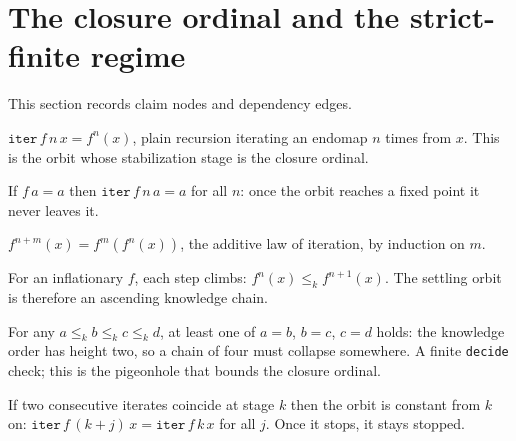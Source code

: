 \section{The closure ordinal and the strict-finite regime}

This section records claim nodes and dependency edges.

\begin{proposition}\label{thm:iter}\leanok{}
$\texttt{iter}\,f\,n\,x = f^n(x)$, plain recursion iterating an endomap $n$ times
from $x$. This is the orbit whose stabilization stage is the closure ordinal.
\end{proposition}
\begin{theorem}\label{thm:iter-fixed-of}\leanok{}
If $f\,a = a$ then $\texttt{iter}\,f\,n\,a = a$ for all $n$: once the orbit
reaches a fixed point it never leaves it.
\end{theorem}
\begin{theorem}\label{thm:iter-add}\leanok{}
$f^{n+m}(x) = f^m(f^n(x))$, the additive law of iteration, by induction on $m$.
\end{theorem}
\begin{theorem}\label{thm:iter-step-le}\leanok{}
For an inflationary $f$, each step climbs: $f^n(x) \le_k f^{n+1}(x)$. The
settling orbit is therefore an ascending knowledge chain.
\end{theorem}
\begin{theorem}\label{thm:kchain-height}\leanok{}
For any $a \le_k b \le_k c \le_k d$, at least one of $a=b$, $b=c$, $c=d$ holds:
the knowledge order has height two, so a chain of four must collapse somewhere.
A finite \texttt{decide} check; this is the pigeonhole that bounds the closure
ordinal.
\end{theorem}
\begin{theorem}\label{thm:iter-propagate}\leanok{}
If two consecutive iterates coincide at stage $k$ then the orbit is constant
from $k$ on: $\texttt{iter}\,f\,(k+j)\,x = \texttt{iter}\,f\,k\,x$ for all $j$.
Once it stops, it stays stopped.
\end{theorem}
